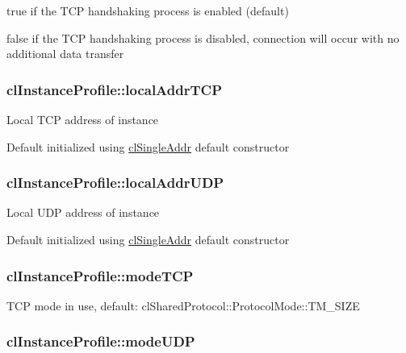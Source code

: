 \label{classcl_instance_profile_ab315c60cef677fc2ffafab78eeca2d52}
true if the TCP handshaking process is enabled (default) \par
 false if the TCP handshaking process is disabled, connection will occur with no additional data transfer \hypertarget{classcl_instance_profile_ad968a9a15fd6a31479c55a067fe09573}{
\subsubsection[{localAddrTCP}]{ {\bf clInstanceProfile::localAddrTCP}}}
\label{classcl_instance_profile_ad968a9a15fd6a31479c55a067fe09573}
Local TCP address of instance \par
 Default initialized using \hyperlink{classcl_single_addr}{clSingleAddr} default constructor \hypertarget{classcl_instance_profile_a76c869ac22c63b389ac5d49b9eb21862}{
\subsubsection[{localAddrUDP}]{ {\bf clInstanceProfile::localAddrUDP}}}
\label{classcl_instance_profile_a76c869ac22c63b389ac5d49b9eb21862}
Local UDP address of instance \par
 Default initialized using \hyperlink{classcl_single_addr}{clSingleAddr} default constructor \hypertarget{classcl_instance_profile_aa33da57b3f604aa9f0df3e2f2e0642cf}{
\subsubsection[{modeTCP}]{ {\bf clInstanceProfile::modeTCP}}}
\label{classcl_instance_profile_aa33da57b3f604aa9f0df3e2f2e0642cf}
TCP mode in use, default: clSharedProtocol::ProtocolMode::TM\_\-SIZE \hypertarget{classcl_instance_profile_a5ca5a16aac3d34666029cc91d9a87657}{
\subsubsection[{modeUDP}]{ {\bf clInstanceProfile::modeUDP}}}
